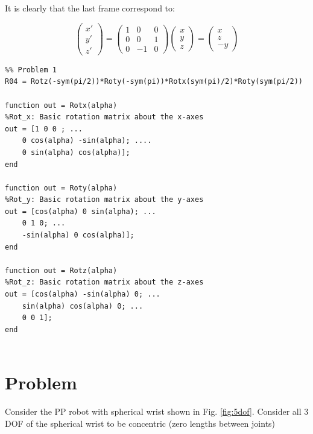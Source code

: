 \documentclass[a4paper,10pt]{article}
\begin{document}
It is clearly that the last frame correspond to:

$$\left(\begin{array}{c} x'\\ y'\\ z' \end{array}\right)  = \left(\begin{array}{ccc} 1 & 0 & 0\\ 0 & 0 & 1\\ 0 & -1 & 0 \end{array}\right)\left(\begin{array}{c} x\\ y\\ z \end{array}\right) = \left(\begin{array}{c} x\\ z\\ -y \end{array}\right)$$

\begin{lstlisting}
%% Problem 1
R04 = Rotz(-sym(pi/2))*Roty(-sym(pi))*Rotx(sym(pi)/2)*Roty(sym(pi/2))

function out = Rotx(alpha)
%Rot_x: Basic rotation matrix about the x-axes 
out = [1 0 0 ; ...
    0 cos(alpha) -sin(alpha); ....
    0 sin(alpha) cos(alpha)]; 
end

function out = Roty(alpha)
%Rot_y: Basic rotation matrix about the y-axes 
out = [cos(alpha) 0 sin(alpha); ...
    0 1 0; ...
    -sin(alpha) 0 cos(alpha)]; 
end

function out = Rotz(alpha)
%Rot_z: Basic rotation matrix about the z-axes 
out = [cos(alpha) -sin(alpha) 0; ...
    sin(alpha) cos(alpha) 0; ...
    0 0 1]; 
end


\end{lstlisting}

\newpage

\section{Problem}

Consider the PP robot with spherical wrist shown in Fig. \ref{fig:5dof}. Consider all 3 DOF of the spherical wrist to be concentric (zero lengths between joints)
\end{document}
